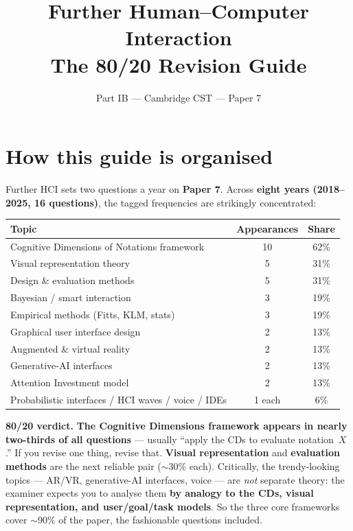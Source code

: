 \documentclass[11pt,a4paper]{article}
\title{\vspace{-1.5cm}\textbf{Further Human--Computer Interaction} \\[2pt] \large The 80/20 Revision Guide}
\author{\small Part IB --- Cambridge CST --- Paper 7}
\date{}
\begin{document}
\maketitle
\vspace{-0.8cm}

\section*{How this guide is organised}

Further HCI sets two questions a year on \textbf{Paper 7}. Across \textbf{eight years (2018--2025, 16 questions)}, the tagged frequencies are strikingly concentrated:

\begin{center}
\begin{tabular}{lcc}
\hline
\textbf{Topic} & \textbf{Appearances} & \textbf{Share} \\
\hline
Cognitive Dimensions of Notations framework & 10 & 62\% \\
Visual representation theory & 5 & 31\% \\
Design \& evaluation methods & 5 & 31\% \\
Bayesian / smart interaction & 3 & 19\% \\
Empirical methods (Fitts, KLM, stats) & 3 & 19\% \\
Graphical user interface design & 2 & 13\% \\
Augmented \& virtual reality & 2 & 13\% \\
Generative-AI interfaces & 2 & 13\% \\
Attention Investment model & 2 & 13\% \\
Probabilistic interfaces / HCI waves / voice / IDEs & 1 each & 6\% \\
\hline
\end{tabular}
\end{center}

\textbf{80/20 verdict.} \textbf{The Cognitive Dimensions framework appears in nearly two-thirds of all questions} --- usually ``apply the CDs to evaluate notation~$X$.'' If you revise one thing, revise that. \textbf{Visual representation} and \textbf{evaluation methods} are the next reliable pair ($\sim$30\% each). Critically, the trendy-looking topics --- AR/VR, generative-AI interfaces, voice --- are \emph{not} separate theory: the examiner expects you to analyse them \textbf{by analogy to the CDs, visual representation, and user/goal/task models}. So the three core frameworks cover $\sim$90\% of the paper, the fashionable questions included.
\end{document}
